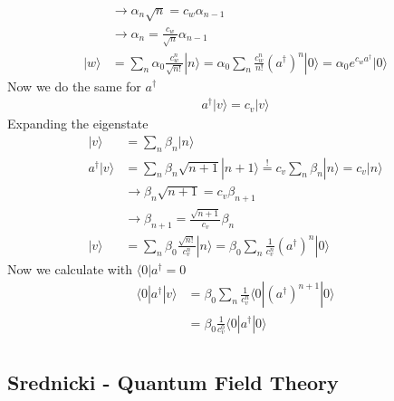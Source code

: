 \documentclass[10pt,a4paper]{article}
\theoremstyle{definition}
\begin{document}
\begin{enumerate}
\begin{align}
    &\rightarrow\alpha_n\sqrt{n}=c_w\alpha_{n-1}\\
    &\rightarrow\alpha_n=\frac{c_w}{\sqrt{n}}\alpha_{n-1}\\
    |w\rangle
    &=\sum_n\alpha_0\frac{c_w^n}{\sqrt{n!}}|n\rangle
    =\alpha_0\sum_n\frac{c_w^n}{n!}(a^\dagger)^n|0\rangle
    =\alpha_0 e^{c_wa^\dagger}|0\rangle
\end{align}
Now we do the same for $a^\dagger$
\begin{align}
    a^\dagger|v\rangle=c_v|v\rangle
\end{align}
Expanding the eigenstate 
\begin{align}
    |v\rangle
    &=\sum_n\beta_n|n\rangle\\
    a^\dagger|v\rangle
    &=\sum_n\beta_n\sqrt{n+1}|n+1\rangle\overset{!}{=}c_v\sum_n\beta_n|n\rangle=c_v|n\rangle\\
    &\rightarrow\beta_{n}\sqrt{n+1}=c_v\beta_{n+1}\\
    &\rightarrow\beta_{n+1}=\frac{\sqrt{n+1}}{c_v}\beta_{n}\\
    |v\rangle
    &=\sum_n\beta_0\frac{\sqrt{n!}}{c_v^n}|n\rangle=\beta_0\sum_n\frac{1}{c_v^n}(a^\dagger)^n|0\rangle
\end{align}
Now we calculate with $\langle 0|a^\dagger=0$
\begin{align}
    \langle 0|a^\dagger|v\rangle&=\beta_0\sum_n\frac{1}{c_v^n}\langle 0|(a^\dagger)^{n+1}|0\rangle\\
    &=\beta_0\frac{1}{c_v^0}\langle 0|a^\dagger|0\rangle\\
\end{align}
\end{enumerate}

\subsection{{\sc Srednicki} - Quantum Field Theory}
\end{document}
